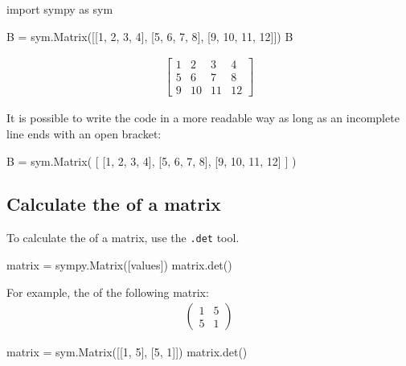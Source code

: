 \begin{pyin}
import sympy as sym

B = sym.Matrix([[1, 2, 3, 4], [5, 6, 7, 8], [9, 10, 11, 12]])
B
\end{pyin}




\begin{equation*}
\begin{split}\displaystyle \left[\begin{matrix}1 & 2 & 3 & 4\\5 & 6 & 7 & 8\\9 & 10 & 11 & 12\end{matrix}\right]\end{split}
\end{equation*}

\begin{note}
It is possible to write the code in a more readable way as long as an incomplete
line ends with an open bracket:
\end{note}


\begin{pyin}
B = sym.Matrix(
    [
        [1, 2, 3, 4],
        [5, 6, 7, 8],
        [9, 10, 11, 12]
    ]
)
\end{pyin}


\subsection{Calculate the  of a matrix}
\label{\detokenize{tools-for-mathematics/04-matrices/how/main:calculate-the-determinant-of-a-matrix}}

To calculate the  of a matrix, use the \texttt{.det} tool.

\begin{api}
matrix = sympy.Matrix([values])
matrix.det()
\end{api}



For example, the  of the following matrix:
\begin{equation*}
\begin{split}
    \begin{pmatrix}
    1 & 5\\
    5 & 1
    \end{pmatrix}
\end{split}
\end{equation*}



\begin{pyin}
matrix = sym.Matrix([[1, 5], [5, 1]])
matrix.det()
\end{pyin}




